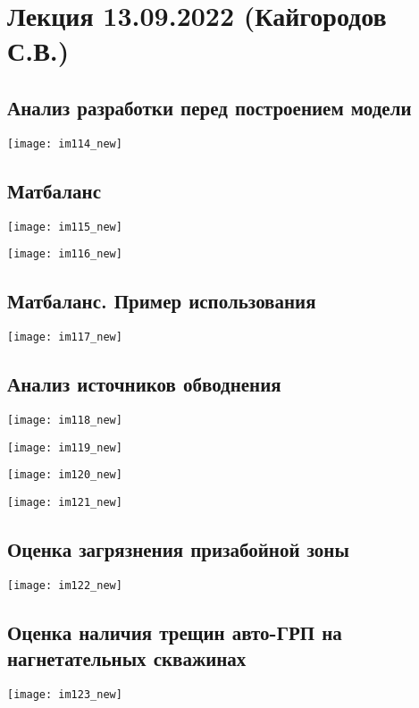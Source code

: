 \documentclass[main.tex]{subfiles}
\begin{document}
\section{Лекция 13.09.2022 (Кайгородов С.В.)}

\subsection{Анализ разработки перед построением модели}

\texttt{[image: im114\_new]}

\subsection{Матбаланс}

\texttt{[image: im115\_new]}

\texttt{[image: im116\_new]}

\subsection{Матбаланс. Пример использования}

\texttt{[image: im117\_new]}

\subsection{Анализ источников обводнения}

\texttt{[image: im118\_new]}

\texttt{[image: im119\_new]}

\texttt{[image: im120\_new]}

\texttt{[image: im121\_new]}

\subsection{Оценка загрязнения призабойной зоны}

\texttt{[image: im122\_new]}

\subsection{Оценка наличия трещин авто-ГРП на нагнетательных скважинах}

\texttt{[image: im123\_new]}
\end{document}
